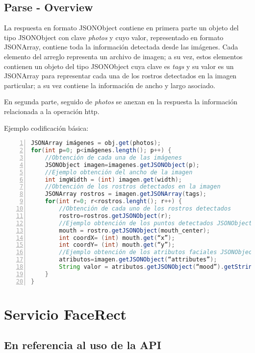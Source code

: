 \subsection*{Parse - Overview }

La respuesta en formato JSONObject contiene en primera parte un objeto
del tipo JSONObject con clave \emph{photos} y cuyo valor, representado
en formato JSONArray, contiene toda la información detectada desde
las imágenes. Cada elemento del arreglo representa un archivo de imagen;
a su vez, estos elementos contienen un objeto del tipo JSONObject
cuya clave es \emph{tags} y su valor es un JSONArray para representar
cada una de los rostros detectados en la imagen particular; a su vez
contiene la información de ancho y largo asociado. 

En segunda parte, seguido de \emph{photos} se anexan en la respuesta
la información relacionada a la operación http.

Ejemplo codificación básica: 

\begin{lstlisting}[language=Java,numbers=left,numberstyle={\tiny},basicstyle={\footnotesize},breaklines=true,captionpos=t,frame=no,keywordstyle={\color{blue}},commentstyle={\color{gray}},stringstyle={\color{red}},numbersep=5pt,emph={label}]
JSONArray imágenes = obj.get(photos); 
for(int p=0; p<imágenes.length(); p++) { 
	//Obtención de cada una de las imágenes  	
	JSONObject imagen=imagenes.getJSONObject(p);   
	//Ejemplo obtención del ancho de la imagen 
	int imgWidth = (int) imagen.get(width); 
	//Obtención de los rostros detectados en la imagen 
	JSONArray rostros = imagen.getJSONArray(tags); 
	for(int r=0; r<rostros.lenght(); r++) { 
		//Obtención de cada uno de los rostros detectados 
		rostro=rostros.getJSONObject(r);     	 
		//Ejemplo obtención de los puntos detectados JSONObject 
		mouth = rostro.getJSONObject(mouth_center); 
		int coordX= (int) mouth.get(“x”); 
		int coordY= (int) mouth.get(“y”); 
		//Ejemplo obtención de los atributos faciales JSONObject 
		atributos=imagen.getJSONObject(“attributes”); 
		String valor = atributos.getJSONObject(“mood”).getString(“value”); 
	} 	
} 
\end{lstlisting}



\section*{Servicio FaceRect}


\subsection*{En referencia al uso de la API }

